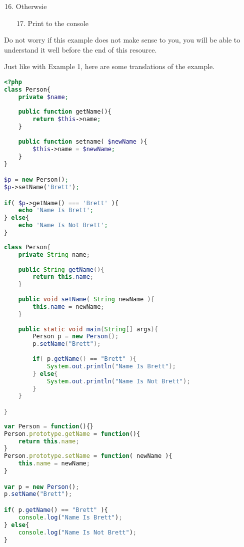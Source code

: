 \begin{enumerate}
    \setcounter{enumi}{15}
    \item {Otherwsie}
    \begin{enumerate}
        \setcounter{enumii}{16}
        \item {Print  to the console}
    \end{enumerate}

\end{enumerate}

Do not worry if this example does not make sense to you, you will be able to understand it well before the end of this resource.
\par

Just like with Example 1, here are some translations of the example.

\begin{lstlisting}[language=php,caption={Example 2 - PHP}]
<?php
class Person{
    private $name;
    
    public function getName(){
        return $this->name;
    }
    
    public function setname( $newName ){
        $this->name = $newName;
    }
}

$p = new Person();
$p->setName('Brett');

if( $p->getName() === 'Brett' ){
    echo 'Name Is Brett';
} else{
    echo 'Name Is Not Brett';
}
\end{lstlisting}

\begin{lstlisting}[language=java,caption={Eample 2 - Java}]
class Person{
    private String name;
    
    public String getName(){
        return this.name;
    }
    
    public void setName( String newName ){
        this.name = newName;
    }
    
    public static void main(String[] args){
        Person p = new Person();
        p.setName("Brett");
        
        if( p.getName() == "Brett" ){
            System.out.println("Name Is Brett");
        } else{
            System.out.println("Name Is Not Brett");
        }
    }

}
\end{lstlisting}

\begin{lstlisting}[language=javascript,caption={Example 2 - Node.JS}]
var Person = function(){}
Person.prototype.getName = function(){
    return this.name;
}
Person.prototype.setName = function( newName ){
    this.name = newName;
}

var p = new Person();
p.setName("Brett");

if( p.getName() == "Brett" ){
    console.log("Name Is Brett");
} else{
    console.log("Name Is Not Brett");
}
\end{lstlisting}

